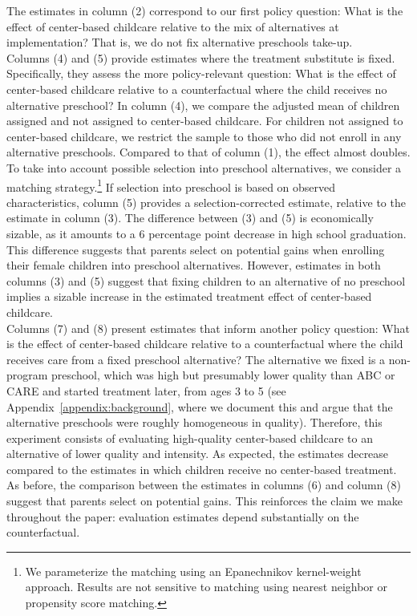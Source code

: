 \noindent The estimates in column (2) correspond to our first policy question: What is the effect of center-based childcare relative to the mix of alternatives at implementation? That is, we do not fix alternative preschools take-up.\\

\noindent Columns (4) and (5) provide estimates where the treatment substitute is fixed. Specifically, they assess the more policy-relevant question: What is the effect of center-based childcare relative to a counterfactual where the child receives no alternative preschool? In column (4), we compare the adjusted mean of children assigned and not assigned to center-based childcare. For children not assigned to center-based childcare, we restrict the sample to those who did not enroll in any alternative preschools. Compared to that of column (1), the effect almost doubles. To take into account possible selection into preschool alternatives, we consider a matching strategy.\footnote{We parameterize the matching using an Epanechnikov kernel-weight approach. Results are not sensitive to matching using nearest neighbor or propensity score matching.} If selection into preschool is based on observed characteristics, column (5) provides a selection-corrected estimate, relative to the estimate in column (3). The difference between (3) and (5) is economically sizable, as it amounts to a 6 percentage point decrease in high school graduation. This difference suggests that parents select on potential gains when enrolling their female children into preschool alternatives. However, estimates in both columns (3) and (5) suggest that fixing children to an alternative of no preschool implies a sizable increase in the estimated treatment effect of center-based childcare. \\

\noindent Columns (7) and (8) present estimates that inform another policy question: What is the effect of center-based childcare relative to a counterfactual where the child receives care from a fixed preschool alternative? The alternative we fixed is a non-program preschool, which was high but  presumably lower quality than ABC or CARE and started treatment later, from ages 3 to 5 (see Appendix~\ref{appendix:background}, where we document this and argue that the alternative preschools were roughly homogeneous in quality). Therefore, this experiment consists of evaluating high-quality center-based childcare to an alternative of lower quality and intensity. As expected, the estimates decrease compared to the estimates in which children receive no center-based treatment. As before, the comparison between the estimates in columns (6) and column (8) suggest that parents select on potential gains. This reinforces the claim we make throughout the paper: evaluation estimates depend substantially on the counterfactual.\\


